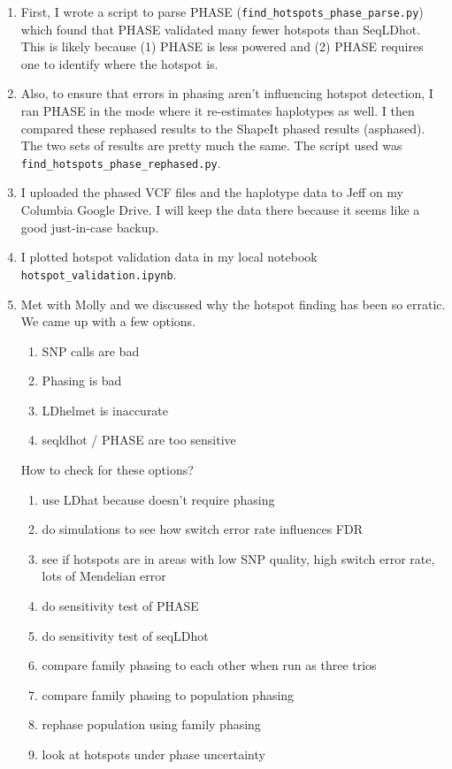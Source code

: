 \documentclass[idxtotoc,hyperref,openany,oneside]{labbook} %
\begin{document}
\begin{enumerate}
\item First, I wrote a script to parse PHASE (\verb+find_hotspots_phase_parse.py+) which found that PHASE validated many fewer hotspots than SeqLDhot. This is likely because (1) PHASE is less powered and (2) PHASE requires one to identify where the hotspot is.
\item Also, to ensure that errors in phasing aren't influencing hotspot detection, I ran PHASE in the mode where it re-estimates haplotypes as well. I then compared these rephased results to the ShapeIt phased results (asphased). The two sets of results are pretty much the same. The script used was \verb+find_hotspots_phase_rephased.py+.
\item I uploaded the phased VCF files and the haplotype data to Jeff on my Columbia Google Drive. I will keep the data there because it seems like a good just-in-case backup.
\item I plotted hotspot validation data in my local notebook \verb+hotspot_validation.ipynb+.
\item Met with Molly and we discussed why the hotspot finding has been so erratic. We came up with a few options. 
\begin{enumerate}
	\item SNP calls are bad
	\item Phasing is bad
	\item LDhelmet is inaccurate
	\item seqldhot / PHASE are too sensitive
 \end{enumerate}
 How to check for these options?
 \begin{enumerate}
 	\item use LDhat because doesn't require phasing
 	\item do simulations to see how switch error rate influences FDR
 	\item see if hotspots are in areas with low SNP quality, high switch error rate, lots of Mendelian error
 	\item do sensitivity test of PHASE
 	\item do sensitivity test of seqLDhot
 	\item compare family phasing to each other when run as three trios
 	\item compare family phasing to population phasing
 	\item rephase population using family phasing
 	\item look at hotspots under phase uncertainty

\end{enumerate}
\end{enumerate}
\end{document}
